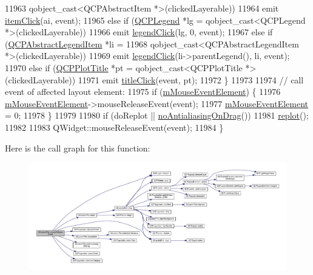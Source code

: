 \begin{DoxyCode}
11963                  qobject\_cast<QCPAbstractItem *>(clickedLayerable))
11964       emit \hyperlink{class_q_custom_plot_ae16b51f52d2b7aebbc7e3e74e6ff2e4b}{itemClick}(ai, event);
11965     \textcolor{keywordflow}{else} \textcolor{keywordflow}{if} (\hyperlink{class_q_c_p_legend}{QCPLegend} *lg = qobject\_cast<QCPLegend *>(clickedLayerable))
11966       emit \hyperlink{class_q_custom_plot_a79cff0baafbca10a3aaf694d2d3b9ab3}{legendClick}(lg, 0, event);
11967     \textcolor{keywordflow}{else} \textcolor{keywordflow}{if} (\hyperlink{class_q_c_p_abstract_legend_item}{QCPAbstractLegendItem} *li =
11968                  qobject\_cast<QCPAbstractLegendItem *>(clickedLayerable))
11969       emit \hyperlink{class_q_custom_plot_a79cff0baafbca10a3aaf694d2d3b9ab3}{legendClick}(li->parentLegend(), li, event);
11970     \textcolor{keywordflow}{else} \textcolor{keywordflow}{if} (\hyperlink{class_q_c_p_plot_title}{QCPPlotTitle} *pt = qobject\_cast<QCPPlotTitle *>(clickedLayerable))
11971       emit \hyperlink{class_q_custom_plot_a2137a819e518fee7edd1c0bf5984d8d6}{titleClick}(event, pt);
11972   \}
11973 
11974   \textcolor{comment}{// call event of affected layout element:}
11975   \textcolor{keywordflow}{if} (\hyperlink{class_q_custom_plot_a2f2e8b25e59cf3cf7b15e4767c02e747}{mMouseEventElement}) \{
11976     \hyperlink{class_q_custom_plot_a2f2e8b25e59cf3cf7b15e4767c02e747}{mMouseEventElement}->mouseReleaseEvent(event);
11977     \hyperlink{class_q_custom_plot_a2f2e8b25e59cf3cf7b15e4767c02e747}{mMouseEventElement} = 0;
11978   \}
11979 
11980   \textcolor{keywordflow}{if} (doReplot || \hyperlink{class_q_custom_plot_ae07f2895a34d13a97a10cae4d8e17a36}{noAntialiasingOnDrag}())
11981     \hyperlink{class_q_custom_plot_a606fd384b2a637ce2c24899bcbde77d6}{replot}();
11982 
11983   QWidget::mouseReleaseEvent(event);
11984 \}
\end{DoxyCode}


Here is the call graph for this function\+:\nopagebreak
\begin{figure}[H]
\begin{center}
\leavevmode
\includegraphics[width=350pt]{class_q_custom_plot_a724e97d2e8c03e68adac5f4b6164a1b3_cgraph}
\end{center}
\end{figure}


